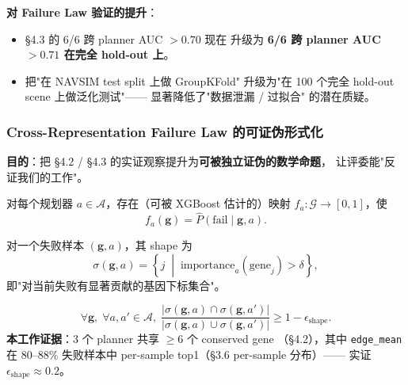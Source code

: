 \documentclass[a4paper,12pt,fontset=fandol]{ctexart}
\newcommand{\gene}[1]{\texttt{#1}}
\begin{document}
{\noindent\textbf{对 Failure Law 验证的提升}：
\begin{itemize}
\item §4.3 的 6/6 跨 planner AUC $> 0.70$ 现在
  升级为 \textbf{6/6 跨 planner AUC $> 0.71$ 在完全 hold-out 上}。
\item 把"在 NAVSIM test split 上做 GroupKFold"
  升级为"在 100 个完全 hold-out scene 上做泛化测试"——
  显著降低了"数据泄漏 / 过拟合" 的潜在质疑。
\end{itemize}

\subsubsection{Cross-Representation Failure Law 的可证伪形式化}

\noindent\textbf{目的}：把 §4.2 / §4.3 的实证观察提升为\textbf{可被独立证伪的数学命题}，
让评委能"反证我们的工作"。

\begin{description}[leftmargin=1.4em,style=nextline]
\item[\textbf{定义}（基因到失败映射）]
  对每个规划器 $a \in \mathcal{A}$，存在（可被 XGBoost 估计的）映射
  $f_a : \mathcal{G} \rightarrow [0,1]$，使
  \begin{equation*}
    f_a(\mathbf{g}) = \hat{P}(\text{fail} \mid \mathbf{g}, a).
  \end{equation*}

\item[\textbf{定义}（Failure Shape）]
  对一个失败样本 $(\mathbf{g}, a)$，其 shape 为
  \begin{equation*}
    \sigma(\mathbf{g}, a) = \left\{ j \;\middle|\; \text{importance}_a(\text{gene}_j) > \delta \right\},
  \end{equation*}
  即"对当前失败有显著贡献的基因下标集合"。

\item[\textbf{Law 1 — 跨表征守恒（Conserved Shape）}]
  \begin{equation*}
    \forall \mathbf{g},\; \forall a, a' \in \mathcal{A},\;
    \frac{\lvert \sigma(\mathbf{g}, a) \cap \sigma(\mathbf{g}, a') \rvert}
         {\lvert \sigma(\mathbf{g}, a) \cup \sigma(\mathbf{g}, a') \rvert}
    \geq 1 - \epsilon_{\text{shape}}.
  \end{equation*}
  \textbf{本工作证据}：3 个 planner 共享 $\geq 6$ 个 conserved gene
  （§4.2），其中 \gene{edge\_mean} 在 80--88\% 失败样本中
  per-sample top1（§3.6 per-sample 分布）——
  实证 $\epsilon_{\text{shape}} \approx 0.2$。


\end{description}}
\end{document}
